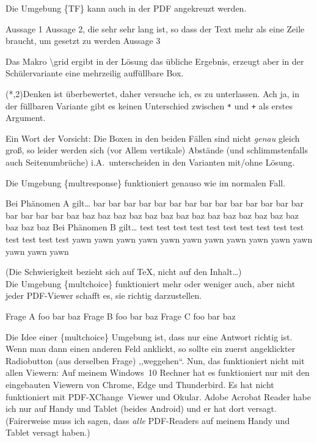 \documentclass[hyperworksheet]{drcschool}
\newcommand*{\cs}[1]{\textup{\ttfamily\textbackslash#1}}                   %
\newcommand*{\env}[1]{\textup{\ttfamily\{#1\}}}                            %
\begin{document}
\begin{hyperworksheet}
Die Umgebung \env{TF} kann auch in der PDF angekreuzt werden.
\begin{TF}[.8\linewidth]
Aussage 1 \true
\midrule
Aussage 2, die sehr sehr lang ist, so dass der Text mehr als eine Zeile braucht, um gesetzt zu werden \false
\midrule
Aussage 3 \false
\end{TF}

\exercise[Grids]
Das Makro \cs{grid} ergibt in der Lösung das übliche Ergebnis, erzeugt aber in der Schülervariante
eine mehrzeilig auf{}füllbare Box.

\grid(*,2){Denken ist überbewertet, daher versuche ich, es zu unterlassen. Ach ja, in der füllbaren Variante gibt es keinen
Unterschied zwischen \texttt{*} und \texttt{+} als erstes Argument.}

\noindent
Ein Wort der Vorsicht: Die Boxen in den beiden Fällen sind nicht \emph{genau}
gleich groß, so leider werden
sich (vor Allem vertikale) Abstände (und schlimmstenfalls auch Seitenumbrüche) i.A.~unterscheiden
in den Varianten mit/ohne Lösung.

\easy{}
Die Umgebung \env{multresponse} funktioniert genauso wie im normalen Fall.
\begin{multresponse}
\question Bei Phänomen A gilt\ldots
\choice* bar bar bar bar bar bar bar bar bar bar bar bar bar bar bar bar bar bar
\choice* baz baz baz baz baz baz baz baz baz baz baz baz baz baz baz baz baz baz
\question Bei Phänomen B gilt\ldots
\choice* test test test test test test test test test test test test test test
\choice yawn yawn yawn yawn yawn yawn yawn yawn yawn yawn yawn yawn yawn yawn
\end{multresponse}

\hard{}
(Die Schwierigkeit bezieht sich auf \TeX, nicht auf den Inhalt\ldots)\\
Die Umgebung \env{multchoice} funktioniert
mehr oder weniger auch, aber nicht jeder PDF-Viewer schafft es, sie
richtig darzustellen.
\begin{multchoice*}{3}
\question Frage A
\choice foo
\choice* bar
\choice baz
\question Frage B
\choice foo
\choice bar
\choice* baz
\question Frage C
\choice* foo
\choice bar
\choice baz
\end{multchoice*}
Die Idee einer \env{multchoice} Umgebung ist, dass nur eine Antwort richtig
ist. Wenn man dann einen anderen Feld anklickt, so sollte ein zuerst angeklickter
Radiobutton (aus derselben Frage) ,,weggehen``. Nun, das funktioniert nicht mit
allen Viewern: Auf meinem Windows~10 Rechner hat es funktioniert nur mit den
eingebauten Viewern von Chrome, Edge und Thunderbird. Es hat nicht funktioniert
mit PDF-XChange~Viewer und Okular. Adobe Acrobat Reader habe ich nur auf Handy
und Tablet (beides Android) und er hat dort versagt. (Fairerweise muss ich sagen,
dass \emph{alle} PDF-Readers auf meinem Handy und Tablet versagt haben.)


\end{hyperworksheet}
\end{document}
